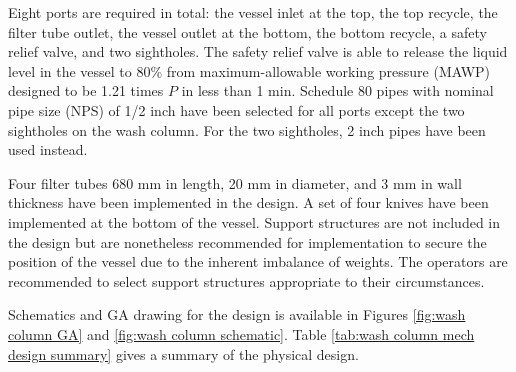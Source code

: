 Eight ports are required in total: the vessel inlet at the top, the top recycle, the filter tube outlet, the vessel outlet at the bottom, the bottom recycle, a safety relief valve, and two sightholes. The safety relief valve is able to release the liquid level in the vessel to 80\% from maximum-allowable working pressure (MAWP) designed to be 1.21 times $P$ in less than 1 min. Schedule 80 pipes with nominal pipe size (NPS) of 1/2 inch have been selected for all ports except the two sightholes on the wash column. For the two sightholes, 2 inch pipes have been used instead. 

Four filter tubes 680 mm in length, 20 mm in diameter, and 3 mm in wall thickness have been implemented in the design. A set of four knives have been implemented at the bottom of the vessel. Support structures are not included in the design but are nonetheless recommended for implementation to secure the position of the vessel due to the inherent imbalance of weights. The operators are recommended to select support structures appropriate to their circumstances. 

Schematics and GA drawing for the design is available in Figures \ref{fig:wash column GA} and \ref{fig:wash column schematic}. Table \ref{tab:wash column mech design summary} gives a summary of the physical design. 

